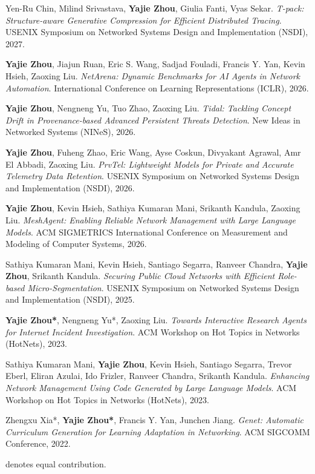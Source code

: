 \documentclass[11pt,letterpaper]{article}
\newcommand{\publication}[4]{%
  \item #1. \textit{#2}. #3, #4.
}
\begin{document}
\begin{enumerate}[label={[C\arabic*]},leftmargin=2.6em]
    \publication{Yen-Ru Chin, Milind Srivastava, \textbf{Yajie Zhou}, Giulia Fanti, Vyas Sekar}
      {T-pack: Structure-aware Generative Compression for Efficient Distributed Tracing}
      {USENIX Symposium on Networked Systems Design and Implementation (NSDI)}{2027}

    \publication{\textbf{Yajie Zhou}, Jiajun Ruan, Eric S. Wang, Sadjad Fouladi, Francis Y. Yan, Kevin Hsieh, Zaoxing Liu}
      {NetArena: Dynamic Benchmarks for AI Agents in Network Automation}
      {International Conference on Learning Representations (ICLR)}{2026}

    \publication{\textbf{Yajie Zhou}, Nengneng Yu, Tuo Zhao, Zaoxing Liu}
      {Tidal: Tackling Concept Drift in Provenance-based Advanced Persistent Threats Detection}
      {New Ideas in Networked Systems (NINeS)}{2026}

    \publication{\textbf{Yajie Zhou}, Fuheng Zhao, Eric Wang, Ayse Coskun, Divyakant Agrawal, Amr El Abbadi, Zaoxing Liu}
      {PrvTel: Lightweight Models for Private and Accurate Telemetry Data Retention}
      {USENIX Symposium on Networked Systems Design and Implementation (NSDI)}{2026}

    \publication{\textbf{Yajie Zhou}, Kevin Hsieh, Sathiya Kumaran Mani, Srikanth Kandula, Zaoxing Liu}
      {MeshAgent: Enabling Reliable Network Management with Large Language Models}
      {ACM SIGMETRICS International Conference on Measurement and Modeling of Computer Systems}{2026}

    \publication{Sathiya Kumaran Mani, Kevin Hsieh, Santiago Segarra, Ranveer Chandra, \textbf{Yajie Zhou}, Srikanth Kandula}
      {Securing Public Cloud Networks with Efficient Role-based Micro-Segmentation}
      {USENIX Symposium on Networked Systems Design and Implementation (NSDI)}{2025}

    \publication{\textbf{Yajie Zhou*}, Nengneng Yu*, Zaoxing Liu}
      {Towards Interactive Research Agents for Internet Incident Investigation}
      {ACM Workshop on Hot Topics in Networks (HotNets)}{2023}

    \publication{Sathiya Kumaran Mani, \textbf{Yajie Zhou}, Kevin Hsieh, Santiago Segarra, Trevor Eberl, Eliran Azulai, Ido Frizler, Ranveer Chandra, Srikanth Kandula}
      {Enhancing Network Management Using Code Generated by Large Language Models}
      {ACM Workshop on Hot Topics in Networks (HotNets)}{2023}

    \publication{Zhengxu Xia*, \textbf{Yajie Zhou*}, Francis Y. Yan, Junchen Jiang}
      {Genet: Automatic Curriculum Generation for Learning Adaptation in Networking}
      {ACM SIGCOMM Conference}{2022}
\end{enumerate}
{\small * denotes equal contribution.}
\end{document}
